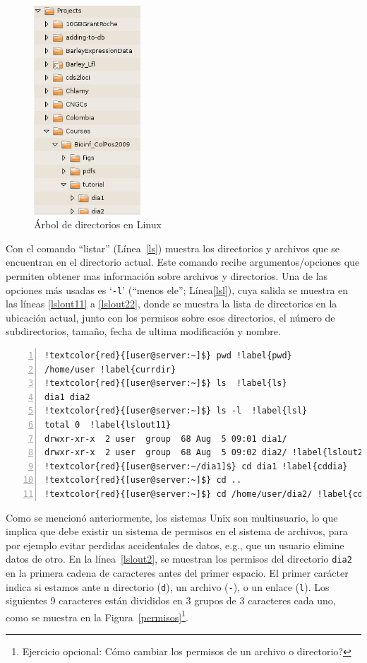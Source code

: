 \documentclass[letter,11pt]{book}
\begin{document}
\begin{figure}[ht]
\centering
   \includegraphics[width=4cm]{Figs/arboldir.png}
  \caption{\label{arboldir}Árbol de directorios en Linux}
\end{figure}

Con el comando ``listar'' (Línea~\ref{ls}) muestra los directorios y archivos que se encuentran en el directorio actual. Este comando recibe argumentos/opciones que permiten obtener mas información sobre archivos y directorios. Una de las opciones más usadas es `\Verb+-l+' (``menos ele''; Línea\ref{lsl}), cuya salida se muestra en las líneas \ref{lslout11} a \ref{lslout22}, donde se muestra la lista de directorios en la ubicación actual, junto con los permisos sobre esos directorios, el número de subdirectorios, tamaño, fecha de ultima modificación y nombre.

\begin{Verbatim}[commandchars=!\{\},numbers=left,firstnumber=last,label=Navegando al árbol de directorios,frame=topline,fontsize=\scriptsize]
!textcolor{red}{[user@server:~]$} pwd !label{pwd}
/home/user !label{currdir}
!textcolor{red}{[user@server:~]$} ls  !label{ls}
dia1 dia2
!textcolor{red}{[user@server:~]$} ls -l  !label{lsl}
total 0  !label{lslout11}
drwxr-xr-x  2 user  group  68 Aug  5 09:01 dia1/
drwxr-xr-x  2 user  group  68 Aug  5 09:02 dia2/ !label{lslout22}
!textcolor{red}{[user@server:~/dia1]$} cd dia1 !label{cddia}
!textcolor{red}{[user@server:~]$} cd ..
!textcolor{red}{[user@server:~]$} cd /home/user/dia2/ !label{cdabsolutepath}
\end{Verbatim} 

Como se mencionó anteriormente, los sistemas Unix son multiusuario, lo que implica que debe existir un sistema de permisos en el sistema de archivos, para por ejemplo evitar perdidas accidentales de datos, e.g., que un usuario elimine datos de otro. En la línea~\ref{lslout2}, se muestran los permisos del directorio \Verb+dia2+ en la primera cadena de caracteres antes del primer espacio. El primer carácter indica si estamos ante n directorio (\Verb+d+), un archivo (\Verb+-+), o un enlace (\Verb+l+). Los siguientes 9 caracteres están divididos en 3 grupos de 3 caracteres cada uno, como se muestra en la Figura~\ref{permisos}\footnote{Ejercicio opcional: {\textquestiondown}Cómo cambiar los permisos de un archivo o directorio?}.
\end{document}
